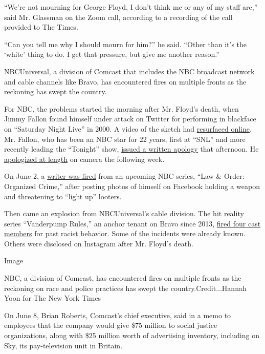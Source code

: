 ``We're not mourning for George Floyd, I don't think me or any of my
staff are,'' said Mr. Glassman on the Zoom call, according to a
recording of the call provided to The Times.

``Can you tell me why I should mourn for him?'' he said. ``Other than
it's the `white' thing to do. I get that pressure, but give me another
reason.''

NBCUniversal, a division of Comcast that includes the NBC broadcast
network and cable channels like Bravo, has encountered fires on multiple
fronts as the reckoning has swept the country.

For NBC, the problems started the morning after Mr. Floyd's death, when
Jimmy Fallon found himself under attack on Twitter for performing in
blackface on ``Saturday Night Live'' in 2000. A video of the sketch had
\href{https://www.youtube.com/watch?v=XPau1pLm3jQ}{resurfaced online}.
Mr. Fallon, who has been an NBC star for 22 years, first at ``SNL'' and
more recently leading the ``Tonight'' show,
\href{https://www.nytimes.com/2020/05/26/us/jimmy-fallon-chris-rock-blackface.html}{issued
a written apology} that afternoon. He
\href{https://deadline.com/2020/06/jimmy-fallon-emotional-apology-snl-blackface-skit-tonight-show-return-naacp-derrick-johnson-cnn-don-lemon-saturday-night-live-video-1202949008/}{apologized
at length} on camera the following week.

On June 2, a
\href{https://variety.com/2020/tv/news/dick-wolf-craig-gore-fired-law-and-order-spinoff-controversial-facebook-posts-1234623190/}{writer
was fired} from an upcoming NBC series, ``Law \& Order: Organized
Crime,'' after posting photos of himself on Facebook holding a weapon
and threatening to ``light up'' looters.

Then came an explosion from NBCUniversal's cable division. The hit
reality series ``Vanderpump Rules,'' an anchor tenant on Bravo since
2013,
\href{https://www.today.com/popculture/andy-cohen-absolutely-supports-decision-fire-vanderpump-rules-stars-t183908}{fired
four cast members} for past racist behavior. Some of the incidents were
already known. Others were disclosed on Instagram after Mr. Floyd's
death.

Image

NBC, a division of Comcast, has encountered fires on multiple fronts as
the reckoning on race and police practices has swept the
country.Credit...Hannah Yoon for The New York Times

On June 8, Brian Roberts, Comcast's chief executive, said in a memo to
employees that the company would give \$75 million to social justice
organizations, along with \$25 million worth of advertising inventory,
including on Sky, its pay-television unit in Britain.

